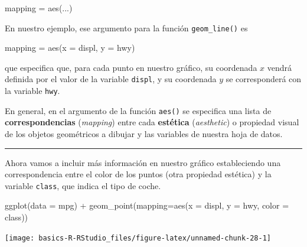 \documentclass[
  title=normal,
  notoc,
  bib=normal]{mnye}
\newenvironment{Shaded}{\begin{snugshade}}{\end{snugshade}}
\newcommand{\AttributeTok}[1]{\textcolor[rgb]{0.77,0.63,0.00}{#1}}
\newcommand{\FunctionTok}[1]{\textcolor[rgb]{0.00,0.00,0.00}{#1}}
\newcommand{\NormalTok}[1]{#1}
\newcommand{\OtherTok}[1]{\textcolor[rgb]{0.56,0.35,0.01}{#1}}
\newcommand{\SpecialCharTok}[1]{\textcolor[rgb]{0.00,0.00,0.00}{#1}}
\begin{document}
\begin{Shaded}
\begin{Highlighting}[]
\NormalTok{mapping }\OtherTok{=} \FunctionTok{aes}\NormalTok{(...)}
\end{Highlighting}
\end{Shaded}

En nuestro ejemplo, ese argumento para la función \texttt{geom\_line()} es

\begin{Shaded}
\begin{Highlighting}[]
\NormalTok{mapping }\OtherTok{=} \FunctionTok{aes}\NormalTok{(}\AttributeTok{x =}\NormalTok{ displ, }\AttributeTok{y =}\NormalTok{ hwy)}
\end{Highlighting}
\end{Shaded}

que especifica que, para cada punto en nuestro gráfico, su coordenada \(x\) vendrá definida por el valor de la variable \texttt{displ}, y su coordenada \(y\) se corresponderá con la variable \texttt{hwy}.

En general, en el argumento de la función \texttt{aes()} se especifica una lista de \textbf{correspondencias} (\emph{mapping}) entre cada \textbf{estética} (\emph{aesthetic}) o propiedad visual de los objetos geométricos a dibujar y las variables de nuestra hoja de datos.

\begin{center}\rule{0.5\linewidth}{0.5pt}\end{center}

Ahora vamos a incluir más información en nuestro gráfico estableciendo una correspondencia entre el color de los puntos (otra propiedad estética) y la variable \texttt{class}, que indica el tipo de coche.

\begin{Shaded}
\begin{Highlighting}[]
\FunctionTok{ggplot}\NormalTok{(}\AttributeTok{data =}\NormalTok{ mpg) }\SpecialCharTok{+} 
    \FunctionTok{geom\_point}\NormalTok{(}\AttributeTok{mapping=}\FunctionTok{aes}\NormalTok{(}\AttributeTok{x =}\NormalTok{ displ, }\AttributeTok{y =}\NormalTok{ hwy, }\AttributeTok{color =}\NormalTok{ class))  }
\end{Highlighting}
\end{Shaded}

\begin{center}\texttt{[image: basics-R-RStudio\_files/figure-latex/unnamed-chunk-28-1]} \end{center}
\end{document}
